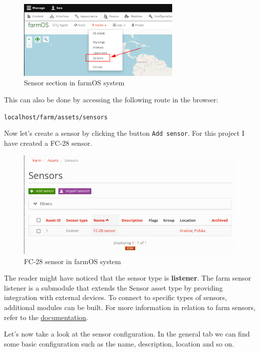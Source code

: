 \begin{figure}[H]
    \centering
    \includegraphics[width=0.7\textwidth]{fig/drupal-install/select-sensor.png}
    \caption{Sensor section in farmOS system}
    \label{fig:select-sensor}
\end{figure}

This can also be done by accessing the following route in the browser:

\verb|localhost/farm/assets/sensors|

\vspace{7mm}
Now let's create a sensor by clicking the button \verb|Add sensor|. For this project I have created a FC-28 sensor.

\begin{figure}[H]
    \centering
    \includegraphics[width=1\textwidth]{fig/drupal-install/created-sensor.png}
    \caption{FC-28 sensor in farmOS system}
    \label{fig:created-sensor}
\end{figure}

The reader might have noticed that the sensor type is \textbf{listener}. The farm sensor listener is a submodule that extends the Sensor asset type by providing integration with external devices. To connect to specific types of sensors, additional modules can be built. For more information in relation to farm sensors, refer to the \href{https://farmos.org/guide/assets/sensors/}{documentation}.

Let's now take a look at the sensor configuration. In the general tab we can find some basic configuration such as the name, description, location and so on.


